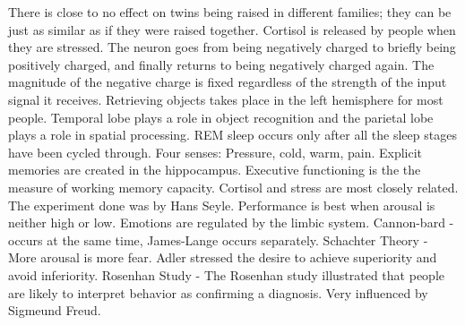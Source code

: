 \markdownRendererInterblockSeparator
{}\markdownRendererUlBeginTight
\markdownRendererUlItem There is close to no effect on twins being raised in different families; they can be just as similar as if they were raised together.\markdownRendererUlItemEnd 
\markdownRendererUlItem Cortisol is released by people when they are stressed.\markdownRendererUlItemEnd 
\markdownRendererUlItem The neuron goes from being negatively charged to briefly being positively charged, and finally returns to being negatively charged again. The magnitude of the negative charge is fixed regardless of the strength of the input signal it receives.\markdownRendererUlItemEnd 
\markdownRendererUlItem Retrieving objects takes place in the left hemisphere for most people.\markdownRendererUlItemEnd 
\markdownRendererUlItem Temporal lobe plays a role in object recognition and the parietal lobe plays a role in spatial processing.\markdownRendererUlItemEnd 
\markdownRendererUlItem REM sleep occurs only after all the sleep stages have been cycled through.\markdownRendererUlItemEnd 
\markdownRendererUlItem Four senses: Pressure, cold, warm, pain.\markdownRendererUlItemEnd 
\markdownRendererUlItem Explicit memories are created in the hippocampus.\markdownRendererUlItemEnd 
\markdownRendererUlItem Executive functioning is the the measure of working memory capacity.\markdownRendererUlItemEnd 
\markdownRendererUlItem Cortisol and stress are most closely related. The experiment done was by Hans Seyle.\markdownRendererUlItemEnd 
\markdownRendererUlItem Performance is best when arousal is neither high or low.\markdownRendererUlItemEnd 
\markdownRendererUlItem Emotions are regulated by the limbic system.\markdownRendererUlItemEnd 
\markdownRendererUlItem Cannon-bard - occurs at the same time, James-Lange occurs separately.\markdownRendererUlItemEnd 
\markdownRendererUlItem Schachter Theory - More arousal is more fear.\markdownRendererUlItemEnd 
\markdownRendererUlItem Adler stressed the desire to achieve superiority and avoid inferiority.\markdownRendererUlItemEnd 
{} Rosenhan Study - The Rosenhan study illustrated that people are likely to interpret behavior as confirming a diagnosis.\markdownRendererUlItemEnd 
\markdownRendererUlEndTight \markdownRendererInterblockSeparator
{}\markdownRendererInterblockSeparator
{}\markdownRendererInterblockSeparator
{}\markdownRendererUlBeginTight
\markdownRendererUlItem Very influenced by Sigmeund Freud.\markdownRendererUlItemEnd 
